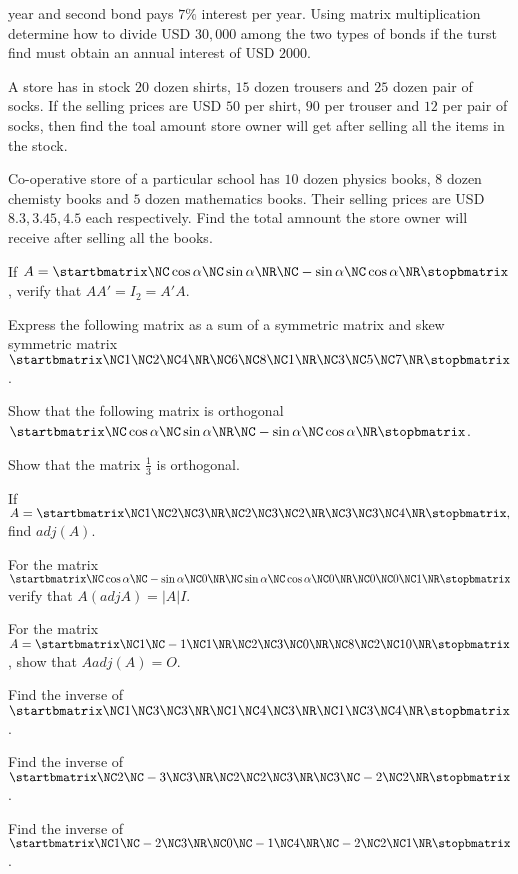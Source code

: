   year and second bond pays $7\%$ interest per year. Using matrix multiplication determine how to divide USD $30,000$ among the two
  types of bonds if the turst find must obtain an annual interest of USD $2000$.
\item A store has in stock $20$ dozen shirts, $15$ dozen trousers and $25$ dozen pair of socks. If the selling prices are USD $50$
  per shirt, $90$ per trouser and $12$ per pair of socks, then find the toal amount store owner will get after selling all the
  items in the stock.
\item Co-operative store of a particular school has $10$ dozen physics books, $8$ dozen chemisty books and $5$ dozen mathematics
  books. Their selling prices are USD $8.3, 3.45, 4.5$ each respectively. Find the total amnount the store owner will receive after
    selling all the books.
\item If $A = \startbmatrix\NC \cos\alpha \NC \sin\alpha \NR\NC -\sin\alpha \NC \cos \alpha\NR\stopbmatrix $, verify that $AA' = I_2 = A'A$.
\item Express the following matrix as a sum of a symmetric matrix and skew symmetric matrix $\startbmatrix\NC 1 \NC 2 \NC 4 \NR\NC 6 \NC 8 \NC 1
  \NR\NC 3 \NC 5 \NC 7\NR\stopbmatrix $.
\item Show that the following matrix is orthogonal $\startbmatrix\NC  \cos\alpha \NC \sin\alpha \NR\NC -\sin\alpha \NC \cos\alpha\NR\stopbmatrix $.
\item Show that the matrix $\frac{1}{3}$\startbmatrix{}   \NR{}   \NR{}  \NR\stopbmatrix is orthogonal.
\item If $A = \startbmatrix\NC 1 \NC 2 \NC 3 \NR\NC 2 \NC 3 \NC 2 \NR\NC 3 \NC 3 \NC 4\NR\stopbmatrix ,$ find $adj(A)$.
\item For the matrix $\startbmatrix\NC \cos\alpha \NC -\sin\alpha \NC 0 \NR\NC\sin\alpha \NC \cos\alpha \NC 0 \NR\NC 0 \NC 0 \NC 1\NR\stopbmatrix $ verify
  that $A(adj A) = |A|I$.
\item For the matrix $A = \startbmatrix\NC 1 \NC -1 \NC 1 \NR\NC 2 \NC 3 \NC 0 \NR\NC 8 \NC 2 \NC 10\NR\stopbmatrix $, show that $A adj(A) = O$.
\item Find the inverse of $\startbmatrix\NC 1 \NC 3 \NC 3 \NR\NC 1 \NC 4 \NC 3 \NR\NC 1 \NC 3 \NC 4\NR\stopbmatrix $.
\item Find the inverse of $\startbmatrix\NC 2 \NC -3 \NC 3 \NR\NC 2 \NC 2 \NC 3 \NR\NC 3 \NC -2 \NC 2\NR\stopbmatrix $.
\item Find the inverse of $\startbmatrix\NC 1 \NC -2 \NC 3 \NR\NC 0 \NC -1 \NC 4 \NR\NC -2 \NC 2 \NC 1\NR\stopbmatrix $.
